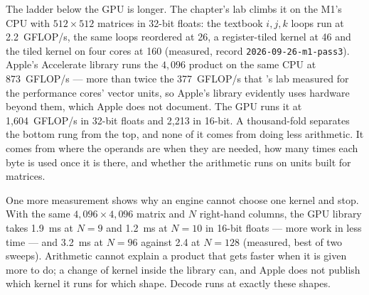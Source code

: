 The ladder below the GPU is longer. The chapter's lab climbs it on the M1's CPU
with $512 \times 512$ matrices in 32-bit floats: the textbook $i,j,k$ loops run at
2.2~GFLOP/s, the same loops reordered at 26, a register-tiled kernel at 46 and
the tiled kernel on four cores at 160 (measured, record
\texttt{2026-09-26-m1-pass3}). Apple's Accelerate library runs the $4{,}096$
product on the same CPU at 873~GFLOP/s --- more than twice the 377~GFLOP/s that
's lab measured for the performance cores' vector units, so
Apple's library evidently uses hardware beyond them, which Apple does not
document. The GPU runs it at 1,604~GFLOP/s in 32-bit floats and 2,213 in 16-bit.
A thousand-fold separates the bottom rung from the top, and none of it comes from
doing less arithmetic. It comes from where the operands are when they are
needed, how many times each byte is used once it is there, and whether the
arithmetic runs on units built for matrices.

One more measurement shows why an engine cannot choose one kernel and stop.
With the same $4{,}096\times4{,}096$ matrix and $N$ right-hand columns, the GPU
library takes 1.9~ms at $N = 9$ and 1.2~ms at $N = 10$ in 16-bit floats --- more
work in less time --- and 3.2~ms at $N = 96$ against 2.4 at $N = 128$ (measured,
best of two sweeps). Arithmetic cannot explain a product that gets faster when it
is given more to do; a change of kernel inside the library can, and Apple does
not publish which kernel it runs for which shape. Decode runs at exactly these
shapes.



